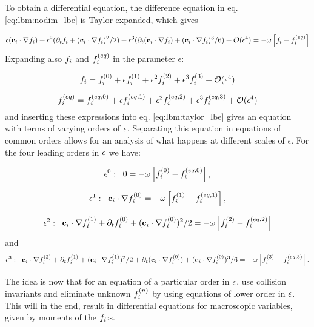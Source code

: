 To obtain a differential equation, the difference equation in
eq. \eqref{eq:lbm:nodim_lbe} is Taylor expanded, which gives

\begin{equation}\label{eq:lbm:taylor_lbe}
\epsilon(\mathbf{c}_i\cdot\nabla f_i) + \epsilon^2 (\partial_tf_i + (\mathbf{c}_i\cdot\nabla f_i)^2/2 ) + \epsilon^3
(\partial_t (\mathbf{c}_i\cdot\nabla f_i) + (\mathbf{c}_i\cdot\nabla f_i)^3/6) + \mathcal{O}(\epsilon^4) = 
-\omega \left[
  f_i - f_i^{(eq)} \right]
\end{equation}
Expanding also $f_i$ and $f_i^{(eq)}$ in the parameter $\epsilon$:

\begin{equation}\label{eq:lbm:fi_exp}
f_i = f_i^{(0)} + \epsilon f_i^{(1)} + \epsilon^2f_i^{(2)} + \epsilon^3f_i^{(3)} + \mathcal{O}(\epsilon^4)
\end{equation}

\begin{equation}\label{eq:lbm:fi_eq_exp}
f_i^{(eq)} = f_i^{(eq, 0)} + \epsilon f_i^{(eq, 1)} + \epsilon^2f_i^{(eq, 2)} + \epsilon^3f_i^{(eq, 3)} +
\mathcal{O}(\epsilon^4)
\end{equation}
and inserting these expressions into eq. \eqref{eq:lbm:taylor_lbe}
gives an equation with terms of varying orders of $\epsilon$. Separating
this equation in equations of common orders allows for an analysis of
what happens at different scales of $\epsilon$. For the four leading
orders in $\epsilon$ we have:

\begin{equation}\label{eq:lbm:ep0}
\epsilon^0:\;\; 0 = -\omega \left[
  f_i^{(0)} - f_i^{(eq, 0)} \right],
\end{equation}

\begin{equation}\label{eq:lbm:ep1}
\epsilon^1:\;\; \mathbf{c}_i\cdot\nabla f_i^{(0)} = -\omega \left[
  f_i^{(1)} - f_i^{(eq, 1)} \right],
\end{equation}

\begin{equation}\label{eq:lbm:ep2}
\epsilon^2:\;\; \mathbf{c}_i\cdot\nabla f_i^{(1)} + \partial_tf_i^{(0)} + (\mathbf{c}_i\cdot\nabla f_i^{(0)})^2/2 =
-\omega \left[ f_i^{(2)} - f_i^{(eq, 2)} \right]
\end{equation}
and
\begin{equation}\label{eq:lbm:ep3}
\epsilon^3:\;\; \mathbf{c}_i\cdot\nabla f_i^{(2)} + \partial_tf_i^{(1)} + (\mathbf{c}_i\cdot\nabla f_i^{(1)})^2/2 +
\partial_t (\mathbf{c}_i\cdot\nabla f_i^{(0)}) + (\mathbf{c}_i\cdot\nabla f_i^{(0)})^3/6 = -\omega \left[ f_i^{(3)} -
  f_i^{(eq, 3)} \right].
\end{equation}

The idea is now that for an equation of a particular order in $\epsilon$,
use collision invariants and eliminate unknown $f_i^{(n)}$ by using
equations of lower order in $\epsilon$. This will in the end, result in
differential equations for macroscopic variables, given by moments of
the $f_i$:s.
